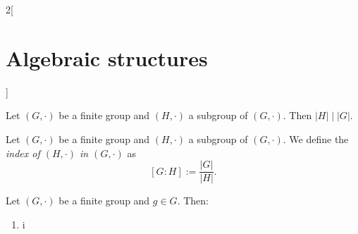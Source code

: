\documentclass[class=article,10pt,crop=false]{standalone}
\begin{document}
\begin{multicols}{2}[\section{Algebraic structures}]
\begin{prop}
\end{prop}
\begin{theorem}
Let $(G,\cdot)$ be a finite group and $(H,\cdot)$ a subgroup of $(G,\cdot)$. Then $|H|\mid|G|$.
\end{theorem}
\begin{definition}
Let $(G,\cdot)$ be a finite group and $(H,\cdot)$ a subgroup of $(G,\cdot)$. We define the \textit{index of $(H,\cdot)$ in $(G,\cdot)$} as $$[G:H]:=\frac{|G|}{|H|}.$$
\end{definition}
\begin{corollary}
Let $(G,\cdot)$ be a finite group and $g\in G$. Then:
\begin{enumerate}
    \item i
\end{enumerate}
\end{corollary}
\end{multicols}
\end{document}
